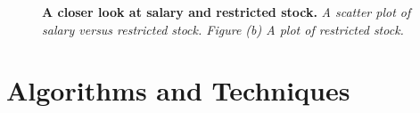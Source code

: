\documentclass[titlepage,numbers=noenddot,headinclude,%
               footinclude=true,abstractoff,BCOR=5mm,%
               paper=a4,fontsize=11pt,ngerman,american]{scrreprt}
\numberwithin{theorem}{chapter}
\numberwithin{definition}{chapter}
\numberwithin{algorithm}{chapter}
\numberwithin{figure}{chapter}
\numberwithin{table}{chapter}
\numberwithin{equation}{chapter}
\begin{document}
\begin{figure}[!hbtp]
\centering

    \caption{\textbf{A closer look at salary and restricted stock.} \textit{A scatter plot of salary versus restricted stock. Figure (b) A plot of restricted stock.}}
\end{figure}

\clearpage
\section*{Algorithms and Techniques}
\end{document}
